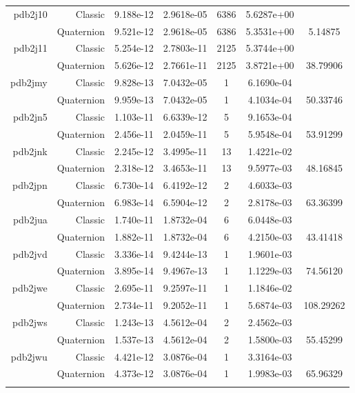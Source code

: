 \begin{xltabular}{\textwidth}{r|rS[table-format=1.3e+2]S[table-format=1.4e+2]cS[table-format=1.4e+2]S[table-format=-1.5]}
pdb2j10 & Classic & 9.188e-12 & 2.9618e-05 & 6386 & 5.6287e+00 & \\
& Quaternion & 9.521e-12 & 2.9618e-05 & 6386 & 5.3531e+00 & 5.14875\\  \addlinespace
pdb2j11 & Classic & 5.254e-12 & 2.7803e-11 & 2125 & 5.3744e+00 & \\
& Quaternion & 5.626e-12 & 2.7661e-11 & 2125 & 3.8721e+00 & 38.79906\\  \addlinespace
pdb2jmy & Classic & 9.828e-13 & 7.0432e-05 & 1 & 6.1690e-04 & \\
& Quaternion & 9.959e-13 & 7.0432e-05 & 1 & 4.1034e-04 & 50.33746\\  \addlinespace
pdb2jn5 & Classic & 1.103e-11 & 6.6339e-12 & 5 & 9.1653e-04 & \\
& Quaternion & 2.456e-11 & 2.0459e-11 & 5 & 5.9548e-04 & 53.91299\\  \addlinespace
pdb2jnk & Classic & 2.245e-12 & 3.4995e-11 & 13 & 1.4221e-02 & \\
& Quaternion & 2.318e-12 & 3.4653e-11 & 13 & 9.5977e-03 & 48.16845\\  \addlinespace
pdb2jpn & Classic & 6.730e-14 & 6.4192e-12 & 2 & 4.6033e-03 & \\
& Quaternion & 6.983e-14 & 6.5904e-12 & 2 & 2.8178e-03 & 63.36399\\  \addlinespace
pdb2jua & Classic & 1.740e-11 & 1.8732e-04 & 6 & 6.0448e-03 & \\
& Quaternion & 1.882e-11 & 1.8732e-04 & 6 & 4.2150e-03 & 43.41418\\  \addlinespace
pdb2jvd & Classic & 3.336e-14 & 9.4244e-13 & 1 & 1.9601e-03 & \\
& Quaternion & 3.895e-14 & 9.4967e-13 & 1 & 1.1229e-03 & 74.56120\\  \addlinespace
pdb2jwe & Classic & 2.695e-11 & 9.2597e-11 & 1 & 1.1846e-02 & \\
& Quaternion & 2.734e-11 & 9.2052e-11 & 1 & 5.6874e-03 & 108.29262\\  \addlinespace
pdb2jws & Classic & 1.243e-13 & 4.5612e-04 & 2 & 2.4562e-03 & \\
& Quaternion & 1.537e-13 & 4.5612e-04 & 2 & 1.5800e-03 & 55.45299\\  \addlinespace
pdb2jwu & Classic & 4.421e-12 & 3.0876e-04 & 1 & 3.3164e-03 & \\
& Quaternion & 4.373e-12 & 3.0876e-04 & 1 & 1.9983e-03 & 65.96329\\  \addlinespace

\end{xltabular}
